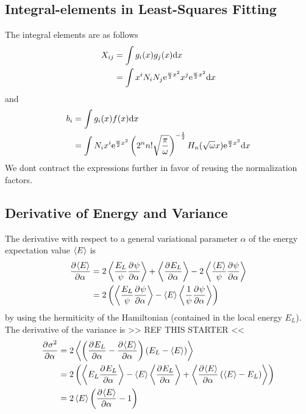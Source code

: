 
\chapter{\label{appendix:B}}

\section{Integral-elements in Least-Squares Fitting}
    The integral elements are as follows
        \begin{align}
            X_{ij} &= \int g_i(x)g_j(x) \mathrm{d} x \nonumber \\
            &= \int x^i N_i N_j \mathrm{e}^{\frac{\omega}{2} x^2} x^j
            \mathrm{e}^{\frac{\omega}{2} x^2} \mathrm{d} x
        \end{align}
    and
        \begin{align}
            b_i &= \int g_i(x)f(x) \mathrm{d} x \nonumber \\
            &= \int N_i x^i \mathrm{e}^{\frac{\omega}{2} x^2}
            \left(2^nn!\sqrt{\frac{\pi}{\omega}}\right)^{-\frac{1}{2}}
            H_n(\sqrt{\omega}x) \mathrm{e}^{\frac{\omega}{2} x^2} \mathrm{d} x
        \end{align}
    We dont contract the expressions further in favor of reusing the
    normalization factors.

\section{Derivative of Energy and Variance}
    The derivative with respect to a general variational parameter $\alpha$ of
    the energy expectation value $\left< {E} \right>$ is
        \begin{align}
            \prd{\alpha}[\ecp{E}] &= 2\ecp{\frac{E_L}{\psi}\prd{\alpha}[\psi]}
            + \ecp{\prd{\alpha}[E_L]} -
            2\ecp{\frac{\ecp{E}}{\psi}\prd{\alpha}[\psi]} \nonumber \\
            &= 2\left(\ecp{\frac{E_L}{\psi}\prd{\alpha}[\psi]} -
            \ecp{E}\ecp{\frac{1}{\psi}\prd{\alpha}[\psi]}\right)
        \end{align}
    by using the hermiticity of the Hamiltonian (contained in the local energy
    $E_L$). \\
    The derivative of the variance is >> REF THIS STARTER <<
        \begin{align}
            \prd{\alpha}[\sigma^2] &= 2\ecp{\left(\prd{\alpha}[E_L] -
            \prd{\alpha}[\ecp{E}]\right) \left(E_L - \ecp{E}\right)} \nonumber
            \\
            &= 2\left(\ecp{E_L\prd{\alpha}[E_L]} -
            \ecp{E}\ecp{\prd{\alpha}[E_L]} +
            \ecp{\prd{\alpha}[\ecp{E}]\left(\ecp{E} - E_L\right)}\right)
            \nonumber \\
            &= 2\ecp{E}\left(\prd{\alpha}[\ecp{E}] - 1\right)
        \end{align}
